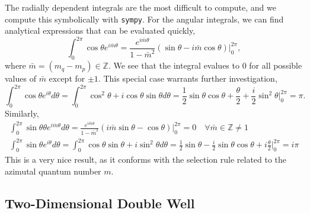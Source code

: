 The radially dependent integrals are the most difficult to compute, and we compute this 
symbolically with \lstinline{sympy}. For the angular integrals, we can find analytical 
expressions that can be evaluated quickly,
\begin{equation}
    \int_0^{2\pi} \cos \theta e^{i\bar{m} \theta} 
    = \frac{e^{i\bar{m}\theta}}{1 - \bar{m}^2}
        (\sin \theta - i \bar{m}\cos \theta)\Big\lvert_0^{2\pi},
\end{equation}
where $\bar{m} = (m_q - m_p) \in \mathbb{Z}$. We see that the integral evalues to $0$ 
for all possible values of $\bar{m}$ except for $\pm1$. This special case warrants further 
investigation,
\begin{equation}
        \int_0^{2\pi} \cos \theta e^{i\theta} d\theta 
        = \int_0^{2\pi} \cos^2\theta + i\cos\theta\sin \theta d\theta 
        = \frac{1}{2}\sin\theta\cos\theta + \frac{\theta}{2} + \frac{i}{2}\sin^2\theta
            \Big\lvert_0^{2\pi} = \pi.
\end{equation}
Similarly,
\begin{equation}
   \begin{gathered}
   \int_0^{2\pi} \sin\theta \theta e^{i\bar{m}\theta}d\theta 
    = \frac{e^{i\bar{m}\theta}}{1 - \bar{m}^2}
        (i\bar{m}\sin\theta - \cos\theta)\Big\lvert_0^{2\pi}
        = 0 \quad \forall \bar{m} \in \mathbb{Z} \neq 1 \\
    \int_0^{2\pi} \sin \theta e^{i \theta} d\theta 
    = \int_0^{2\pi} \cos\theta \sin\theta + i \sin^2\theta d\theta
    = \frac{1}{2} \sin\theta - \frac{i}{2}\sin\theta\cos\theta + i\frac{\theta}{2}
        \Big\lvert_0^{2\pi} = i\pi
   \end{gathered}
\end{equation}
This is a very nice result, as it conforms with the selection rule related to the 
azimutal quantum number $m$.

\subsection{Two-Dimensional Double Well}
\label{sec:2d_double_well}

